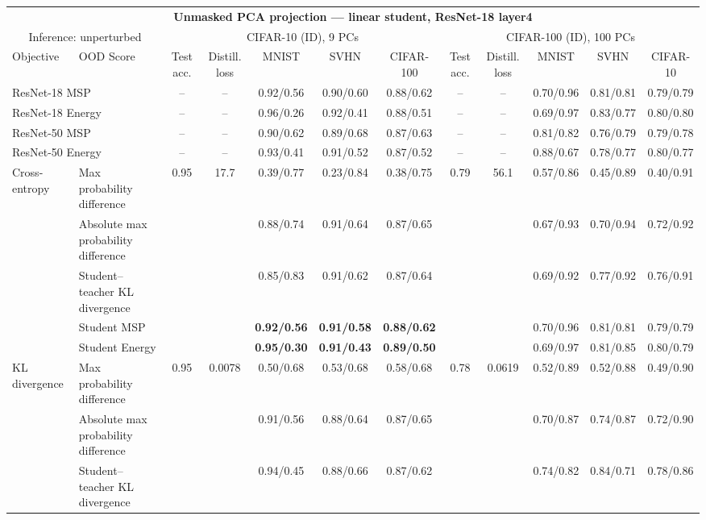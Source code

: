 \documentclass[border=2pt]{standalone}
\begin{document}
\scriptsize
\setlength{\tabcolsep}{3pt}
\begin{tabular}{llcccccccccc}
\multicolumn{12}{c}{\textbf{Unmasked PCA projection --- linear student, ResNet-18 layer4}}\\[4pt]
\multicolumn{2}{c}{Inference: unperturbed} & \multicolumn{5}{c}{CIFAR-10 (ID), 9 PCs} & \multicolumn{5}{c}{CIFAR-100 (ID), 100 PCs} \\
\cmidrule(lr){3-7} \cmidrule(lr){8-12}
\toprule
Objective & OOD Score & Test acc. & Distill. loss & MNIST & SVHN & CIFAR-100 & Test acc. & Distill. loss & MNIST & SVHN & CIFAR-10 \\
\midrule
\multicolumn{2}{l}{ResNet-18 MSP} & -- & -- & 0.92/0.56 & 0.90/0.60 & 0.88/0.62 & -- & -- & 0.70/0.96 & 0.81/0.81 & 0.79/0.79 \\
\multicolumn{2}{l}{ResNet-18 Energy} & -- & -- & 0.96/0.26 & 0.92/0.41 & 0.88/0.51 & -- & -- & 0.69/0.97 & 0.83/0.77 & 0.80/0.80 \\
\multicolumn{2}{l}{ResNet-50 MSP} & -- & -- & 0.90/0.62 & 0.89/0.68 & 0.87/0.63 & -- & -- & 0.81/0.82 & 0.76/0.79 & 0.79/0.78 \\
\multicolumn{2}{l}{ResNet-50 Energy} & -- & -- & 0.93/0.41 & 0.91/0.52 & 0.87/0.52 & -- & -- & 0.88/0.67 & 0.78/0.77 & 0.80/0.77 \\
\midrule
Cross-entropy & Max probability difference & 0.95 & 17.7 & 0.39/0.77 & 0.23/0.84 & 0.38/0.75 & 0.79 & 56.1 & 0.57/0.86 & 0.45/0.89 & 0.40/0.91 \\
 & Absolute max probability difference &  &  & 0.88/0.74 & 0.91/0.64 & 0.87/0.65 &  &  & 0.67/0.93 & 0.70/0.94 & 0.72/0.92 \\
 & Student--teacher KL divergence &  &  & 0.85/0.83 & 0.91/0.62 & 0.87/0.64 &  &  & 0.69/0.92 & 0.77/0.92 & 0.76/0.91 \\
 & Student MSP &  &  & \textbf{0.92/0.56} & \textbf{0.91/0.58} & \textbf{0.88/0.62} &  &  & 0.70/0.96 & 0.81/0.81 & 0.79/0.79 \\
 & Student Energy &  &  & \textbf{0.95/0.30} & \textbf{0.91/0.43} & \textbf{0.89/0.50} &  &  & 0.69/0.97 & 0.81/0.85 & 0.80/0.79 \\
\addlinespace
KL divergence & Max probability difference & 0.95 & 0.0078 & 0.50/0.68 & 0.53/0.68 & 0.58/0.68 & 0.78 & 0.0619 & 0.52/0.89 & 0.52/0.88 & 0.49/0.90 \\
 & Absolute max probability difference &  &  & 0.91/0.56 & 0.88/0.64 & 0.87/0.65 &  &  & 0.70/0.87 & 0.74/0.87 & 0.72/0.90 \\
 & Student--teacher KL divergence &  &  & 0.94/0.45 & 0.88/0.66 & 0.87/0.62 &  &  & 0.74/0.82 & 0.84/0.71 & 0.78/0.86 \\

\end{tabular}
\end{document}
